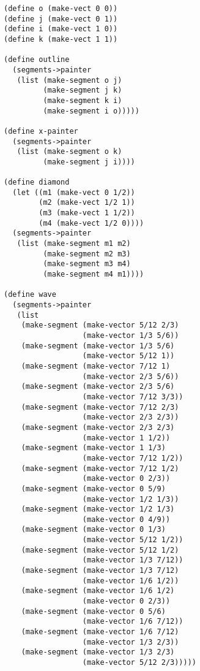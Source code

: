 \documentclass[a4paper,12pt]{article}
\begin{document}
\begin{lstlisting}
(define o (make-vect 0 0))
(define j (make-vect 0 1))
(define i (make-vect 1 0))
(define k (make-vect 1 1))

(define outline
  (segments->painter
   (list (make-segment o j)
         (make-segment j k)
         (make-segment k i)
         (make-segment i o)))))

(define x-painter
  (segments->painter
   (list (make-segment o k)
         (make-segment j i))))

(define diamond
  (let ((m1 (make-vect 0 1/2))
        (m2 (make-vect 1/2 1))
        (m3 (make-vect 1 1/2))
        (m4 (make-vect 1/2 0))))
  (segments->painter
   (list (make-segment m1 m2)
         (make-segment m2 m3)
         (make-segment m3 m4)
         (make-segment m4 m1))))

(define wave
  (segments->painter
   (list
    (make-segment (make-vector 5/12 2/3)
                  (make-vector 1/3 5/6))
    (make-segment (make-vector 1/3 5/6)
                  (make-vector 5/12 1))
    (make-segment (make-vector 7/12 1)
                  (make-vector 2/3 5/6))
    (make-segment (make-vector 2/3 5/6)
                  (make-vector 7/12 3/3))
    (make-segment (make-vector 7/12 2/3)
                  (make-vector 2/3 2/3))
    (make-segment (make-vector 2/3 2/3)
                  (make-vector 1 1/2))
    (make-segment (make-vector 1 1/3)
                  (make-vector 7/12 1/2))
    (make-segment (make-vector 7/12 1/2)
                  (make-vector 0 2/3))
    (make-segment (make-vector 0 5/9)
                  (make-vector 1/2 1/3))
    (make-segment (make-vector 1/2 1/3)
                  (make-vector 0 4/9))
    (make-segment (make-vector 0 1/3)
                  (make-vector 5/12 1/2))
    (make-segment (make-vector 5/12 1/2)
                  (make-vector 1/3 7/12))
    (make-segment (make-vector 1/3 7/12)
                  (make-vector 1/6 1/2))
    (make-segment (make-vector 1/6 1/2)
                  (make-vector 0 2/3))
    (make-segment (make-vector 0 5/6)
                  (make-vector 1/6 7/12))
    (make-segment (make-vector 1/6 7/12)
                  (make-vector 1/3 2/3))
    (make-segment (make-vector 1/3 2/3)
                  (make-vector 5/12 2/3)))))
\end{lstlisting}
\end{document}

